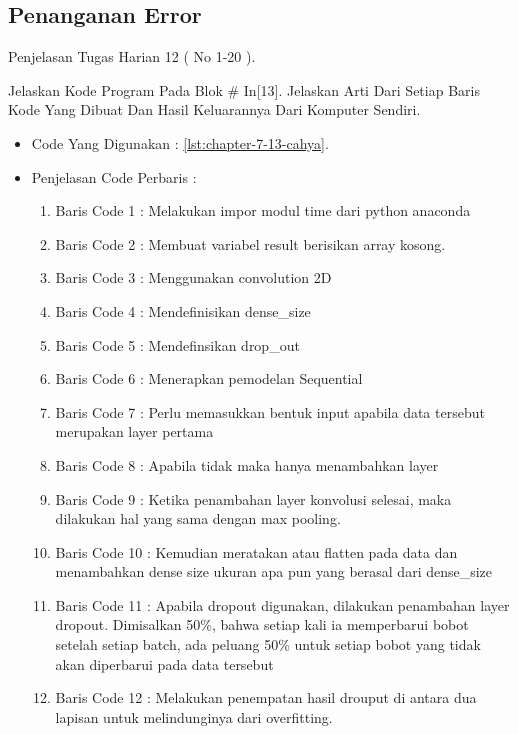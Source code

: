 \subsection{Penanganan Error}
Penjelasan Tugas Harian 12 ( No 1-20 ).
\par
\par
\par
\par
\par
\item Jelaskan Kode Program Pada Blok \# In[13]. Jelaskan Arti Dari Setiap Baris Kode Yang Dibuat Dan Hasil Keluarannya Dari Komputer Sendiri.
\begin{itemize}
\item Code Yang Digunakan : \ref{lst:chapter-7-13-cahya}.

\par
\par
\item Penjelasan Code Perbaris : 
\begin{enumerate}
\item Baris Code 1	: Melakukan impor modul time dari python anaconda
\item Baris Code 2	: Membuat variabel result berisikan array kosong.
\item Baris Code 3	: Menggunakan convolution 2D
\item Baris Code 4	: Mendefinisikan dense\_size
\item Baris Code 5	: Mendefinsikan drop\_out
\item Baris Code 6	: Menerapkan pemodelan Sequential
\item Baris Code 7	: Perlu memasukkan bentuk input apabila data tersebut merupakan layer pertama
\item Baris Code 8	: Apabila tidak maka hanya menambahkan layer
\item Baris Code 9	: Ketika penambahan layer konvolusi selesai, maka dilakukan hal yang sama dengan max pooling.
\item Baris Code 10	: Kemudian meratakan atau flatten pada data dan menambahkan dense size ukuran apa pun yang berasal dari dense\_size
\item Baris Code 11	: Apabila dropout digunakan, dilakukan penambahan layer dropout. Dimisalkan 50\%, bahwa setiap kali ia memperbarui bobot setelah setiap batch, ada peluang 50\% untuk setiap bobot yang tidak akan diperbarui pada data tersebut
\item Baris Code 12	: Melakukan penempatan hasil drouput di antara dua lapisan untuk melindunginya dari overfitting.

\end{enumerate}
\end{itemize}
